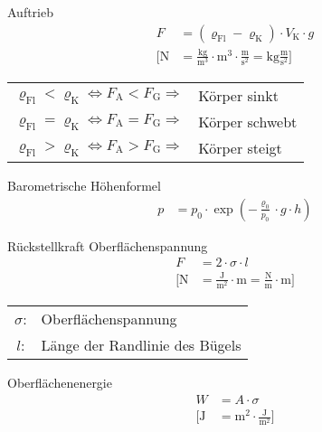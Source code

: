 \begin{karte}{Auftrieb}
    \begin{align*}
        F &= (\varrho_\text{Fl} - \varrho_\text{K}) \cdot V_\text{K} \cdot g \\
        \bigg[ \si{\newton} &= \frac{\si{\kilogram}}{\si{\cubic\meter}} \cdot \si{\cubic\meter} \cdot \frac{\si{\meter}}{\si{\square\second}} = 
            \si{\kilogram} \frac{\si{\meter}}{\si{\square\second}} \bigg]
    \end{align*}
    \begin{tabular}[t]{cl}
        \( \varrho_\text{Fl} < \varrho_\text{K} \Leftrightarrow F_\text{A} < F_\text{G} \Longrightarrow \) & Körper sinkt \\
        \( \varrho_\text{Fl} = \varrho_\text{K} \Leftrightarrow F_\text{A} = F_\text{G} \Longrightarrow \) & Körper schwebt \\
        \( \varrho_\text{Fl} > \varrho_\text{K} \Leftrightarrow F_\text{A} > F_\text{G} \Longrightarrow \) & Körper steigt
    \end{tabular}
\end{karte}

\begin{karte}{Barometrische Höhenformel}
    \begin{align*}
        p &= p_0 \cdot \exp \left(-\frac{\varrho_0}{p_0}\cdot g \cdot h \right)  
    \end{align*}
\end{karte}

\begin{karte}{Rückstellkraft Oberflächenspannung}
    \begin{align*}
        F &= 2 \cdot \sigma \cdot l \\
        \bigg[ \si{\newton} &= \frac{\si{\joule}}{\si{\square\meter}} \cdot \si{\meter}  = \frac{\si{\newton}}{\si{\meter}} \cdot \si{\meter}  \bigg]
    \end{align*}
    \begin{tabular}[t]{cl}
        \(\sigma\): & Oberflächenspannung \\
        \(l\): & Länge der Randlinie des Bügels
    \end{tabular}
\end{karte}

\begin{karte}{Oberflächenenergie}
    \begin{align*}
        W &= A \cdot \sigma \\
        \bigg[ \si{\joule} &= \si{\square\meter} \cdot \frac{\si{\joule}}{\si{\square\meter}} \bigg] \\
    \end{align*}
\end{karte}

